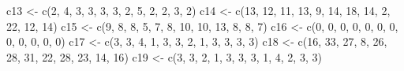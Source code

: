\documentclass[
]{article}
\newenvironment{Shaded}{\begin{snugshade}}{\end{snugshade}}
\newcommand{\DecValTok}[1]{\textcolor[rgb]{0.00,0.00,0.81}{#1}}
\newcommand{\FunctionTok}[1]{\textcolor[rgb]{0.00,0.00,0.00}{#1}}
\newcommand{\NormalTok}[1]{#1}
\newcommand{\OtherTok}[1]{\textcolor[rgb]{0.56,0.35,0.01}{#1}}
\begin{document}
\begin{Shaded}
\begin{Highlighting}[]
\NormalTok{c13 }\OtherTok{\textless{}{-}} \FunctionTok{c}\NormalTok{(}\DecValTok{2}\NormalTok{, }\DecValTok{4}\NormalTok{, }\DecValTok{3}\NormalTok{, }\DecValTok{3}\NormalTok{, }\DecValTok{3}\NormalTok{, }\DecValTok{3}\NormalTok{, }\DecValTok{2}\NormalTok{, }\DecValTok{5}\NormalTok{, }\DecValTok{2}\NormalTok{, }\DecValTok{2}\NormalTok{, }\DecValTok{3}\NormalTok{, }\DecValTok{2}\NormalTok{)}
\NormalTok{c14 }\OtherTok{\textless{}{-}} \FunctionTok{c}\NormalTok{(}\DecValTok{13}\NormalTok{, }\DecValTok{12}\NormalTok{, }\DecValTok{11}\NormalTok{, }\DecValTok{13}\NormalTok{, }\DecValTok{9}\NormalTok{, }\DecValTok{14}\NormalTok{, }\DecValTok{18}\NormalTok{, }\DecValTok{14}\NormalTok{, }\DecValTok{2}\NormalTok{, }\DecValTok{22}\NormalTok{, }\DecValTok{12}\NormalTok{, }\DecValTok{14}\NormalTok{)}
\NormalTok{c15 }\OtherTok{\textless{}{-}} \FunctionTok{c}\NormalTok{(}\DecValTok{9}\NormalTok{, }\DecValTok{8}\NormalTok{, }\DecValTok{8}\NormalTok{, }\DecValTok{5}\NormalTok{, }\DecValTok{7}\NormalTok{, }\DecValTok{8}\NormalTok{, }\DecValTok{10}\NormalTok{, }\DecValTok{10}\NormalTok{, }\DecValTok{13}\NormalTok{, }\DecValTok{8}\NormalTok{, }\DecValTok{8}\NormalTok{, }\DecValTok{7}\NormalTok{)}
\NormalTok{c16 }\OtherTok{\textless{}{-}} \FunctionTok{c}\NormalTok{(}\DecValTok{0}\NormalTok{, }\DecValTok{0}\NormalTok{, }\DecValTok{0}\NormalTok{, }\DecValTok{0}\NormalTok{, }\DecValTok{0}\NormalTok{, }\DecValTok{0}\NormalTok{, }\DecValTok{0}\NormalTok{, }\DecValTok{0}\NormalTok{, }\DecValTok{0}\NormalTok{, }\DecValTok{0}\NormalTok{, }\DecValTok{0}\NormalTok{, }\DecValTok{0}\NormalTok{)}
\NormalTok{c17 }\OtherTok{\textless{}{-}} \FunctionTok{c}\NormalTok{(}\DecValTok{3}\NormalTok{, }\DecValTok{3}\NormalTok{, }\DecValTok{4}\NormalTok{, }\DecValTok{1}\NormalTok{, }\DecValTok{3}\NormalTok{, }\DecValTok{3}\NormalTok{, }\DecValTok{2}\NormalTok{, }\DecValTok{1}\NormalTok{, }\DecValTok{3}\NormalTok{, }\DecValTok{3}\NormalTok{, }\DecValTok{3}\NormalTok{, }\DecValTok{3}\NormalTok{)}
\NormalTok{c18 }\OtherTok{\textless{}{-}} \FunctionTok{c}\NormalTok{(}\DecValTok{16}\NormalTok{, }\DecValTok{33}\NormalTok{, }\DecValTok{27}\NormalTok{, }\DecValTok{8}\NormalTok{, }\DecValTok{26}\NormalTok{, }\DecValTok{28}\NormalTok{, }\DecValTok{31}\NormalTok{, }\DecValTok{22}\NormalTok{, }\DecValTok{28}\NormalTok{, }\DecValTok{23}\NormalTok{, }\DecValTok{14}\NormalTok{, }\DecValTok{16}\NormalTok{)}
\NormalTok{c19 }\OtherTok{\textless{}{-}} \FunctionTok{c}\NormalTok{(}\DecValTok{3}\NormalTok{, }\DecValTok{3}\NormalTok{, }\DecValTok{2}\NormalTok{, }\DecValTok{1}\NormalTok{, }\DecValTok{3}\NormalTok{, }\DecValTok{3}\NormalTok{, }\DecValTok{3}\NormalTok{, }\DecValTok{1}\NormalTok{, }\DecValTok{4}\NormalTok{, }\DecValTok{2}\NormalTok{, }\DecValTok{3}\NormalTok{, }\DecValTok{3}\NormalTok{)}

\end{Highlighting}
\end{Shaded}
\end{document}
